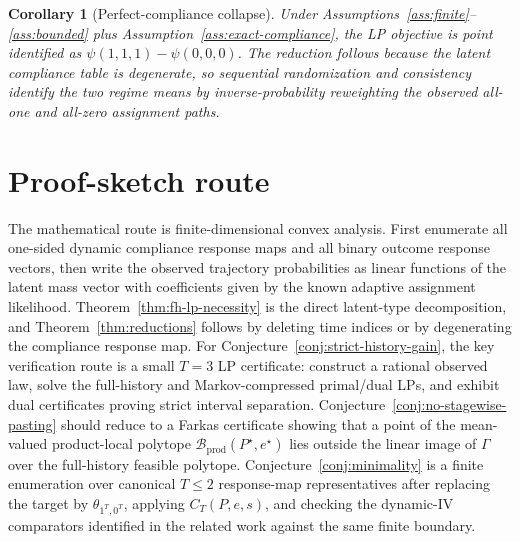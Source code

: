 \documentclass[11pt]{article}
\theoremstyle{definition}
\theoremstyle{plain}
\newtheorem{corollary}{Corollary}
\theoremstyle{remark}
\begin{document}
\begin{corollary}[Perfect-compliance collapse]\label{cor:perfect}
Under Assumptions~\ref{ass:finite}--\ref{ass:bounded} plus Assumption~\ref{ass:exact-compliance}, the LP objective is point identified as \(\psi(1,1,1)-\psi(0,0,0)\).  The reduction follows because the latent compliance table is degenerate, so sequential randomization and consistency identify the two regime means by inverse-probability reweighting the observed all-one and all-zero assignment paths.
\end{corollary}

\section{Proof-sketch route}
The mathematical route is finite-dimensional convex analysis.  First enumerate all one-sided dynamic compliance response maps and all binary outcome response vectors, then write the observed trajectory probabilities as linear functions of the latent mass vector with coefficients given by the known adaptive assignment likelihood.  Theorem~\ref{thm:fh-lp-necessity} is the direct latent-type decomposition, and Theorem~\ref{thm:reductions} follows by deleting time indices or by degenerating the compliance response map.  For Conjecture~\ref{conj:strict-history-gain}, the key verification route is a small \(T=3\) LP certificate: construct a rational observed law, solve the full-history and Markov-compressed primal/dual LPs, and exhibit dual certificates proving strict interval separation.  Conjecture~\ref{conj:no-stagewise-pasting} should reduce to a Farkas certificate showing that a point of the mean-valued product-local polytope \(\mathcal{B}_{\mathrm{prod}}(P^\star,e^\star)\) lies outside the linear image of \(\Gamma\) over the full-history feasible polytope.  Conjecture~\ref{conj:minimality} is a finite enumeration over canonical \(T\le2\) response-map representatives after replacing the target by \(\theta_{1^T,0^T}\), applying \(C_T(P,e,s)\), and checking the dynamic-IV comparators identified in the related work against the same finite boundary.
\end{document}

